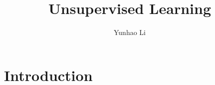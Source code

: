 \documentclass{article}
\title{Unsupervised Learning}
\author{Yunhao Li}
\begin{document}
\maketitle

\section{Introduction}
\end{document}
